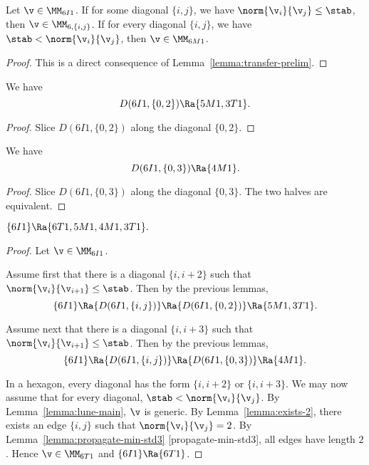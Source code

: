 \begin{lemma}[] Let $\v\in \MM_{6I1}$.  If for some diagonal $\{i,j\}$, we have $\norm{\v_i}{\v_j}\le \stab$,
then $\v\in \MM_{6,\{i,j\}}$.  If for every diagonal $\{i,j\}$, we have $\stab < \norm{\v_i}{\v_j}$, then
$\v \in \MM_{6M1}$.
\end{lemma}

\begin{proof} This is a direct consequence of Lemma~\ref{lemma:transfer-prelim}.
\end{proof}



\begin{lemma}\label{lemma:hex-slice}
We have
\[
D(6I1,\{0,2\}) \Ra \{5M1,3T1\}.
\]
\end{lemma}

\begin{proof}
Slice $D(6I1,\{0,2\})$ along the diagonal $\{0,2\}$.
\end{proof}

\begin{lemma}\label{lemma:hex-slice2}
We have
\[
D(6I1,\{0,3\}) \Ra \{4M1\}.
\]
\end{lemma}

\begin{proof}
Slice $D(6I1,\{0,3\})$ along the diagonal $\{0,3\}$. The two halves are equivalent.
\end{proof}

\begin{lemma}\label{lemma:hex-slice3}
$\{6I1\}\Ra \{6T1,5M1,4M1,3T1\}.$
\end{lemma}

\begin{proof}
Let $\v\in \MM_{6I1}$.  

Assume first that there is a diagonal $\{i,i+2\}$ such that $\norm{\v_i}{\v_{i+1}}\le \stab$.
Then by the previous lemmas,
\[
\{6I1\}\Ra \{D(6I1,\{i,j\})\} \Ra \{D(6I1,\{0,2\})\} \Ra \{5M1,3T1\}.
\]

Assume next
that there is a diagonal $\{i,i+3\}$ such that $\norm{\v_i}{\v_{i+1}}\le \stab$.
Then by the previous lemmas,
\[
\{6I1\}\Ra \{D(6I1,\{i,j\})\} \Ra \{D(6I1,\{0,3\})\} \Ra \{4M1\}.
\]

In a hexagon, every diagonal has the form $\{i,i+2\}$ or $\{i,i+3\}$.  We may now assume that
for every diagonal, $\stab < \norm{\v_i}{\v_j}$.  By Lemma~\ref{lemma:lune-main}, $\v$ is generic.
By Lemma~\ref{lemma:exists-2}, there exists an edge $\{i,j\}$ such that $\norm{\v_i}{\v_j} = 2$.
By Lemma~\ref{lemma:propagate-min-std3} [propagate-min-std3], all edges have length $2$.
Hence $\v\in \MM_{6T1}$ and $\{6I1\}\Ra \{6T1\}$.
\end{proof}

